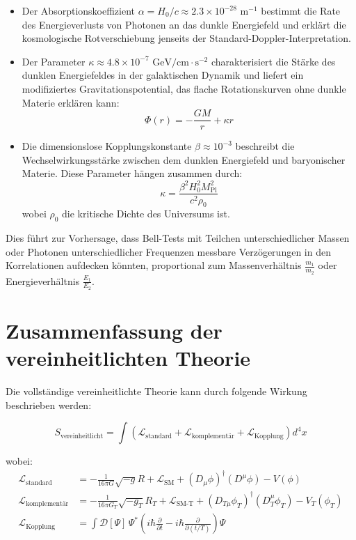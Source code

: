 \documentclass{article}
\begin{document}
	\begin{itemize}
		\item Der Absorptionskoeffizient $\alpha = H_0/c \approx 2.3 \times 10^{-28} \text{ m}^{-1}$ bestimmt die Rate des Energieverlusts von Photonen an das dunkle Energiefeld und erklärt die kosmologische Rotverschiebung jenseits der Standard-Doppler-Interpretation.
		
		\item Der Parameter $\kappa \approx 4.8 \times 10^{-7} \text{ GeV/cm}\cdot\text{s}^{-2}$ charakterisiert die Stärke des dunklen Energiefeldes in der galaktischen Dynamik und liefert ein modifiziertes Gravitationspotential, das flache Rotationskurven ohne dunkle Materie erklären kann:
		\[
		\Phi(r) = -\frac{GM}{r} + \kappa r
		\]
		
		\item Die dimensionslose Kopplungskonstante $\beta \approx 10^{-3}$ beschreibt die Wechselwirkungsstärke zwischen dem dunklen Energiefeld und baryonischer Materie. Diese Parameter hängen zusammen durch:
		\[
		\kappa = \frac{\beta^2 H_0^2 M_{\text{Pl}}^2}{c^2 \rho_0}
		\]
		wobei $\rho_0$ die kritische Dichte des Universums ist.
	\end{itemize}
	
	Dies führt zur Vorhersage, dass Bell-Tests mit Teilchen unterschiedlicher Massen oder Photonen unterschiedlicher Frequenzen messbare Verzögerungen in den Korrelationen aufdecken könnten, proportional zum Massenverhältnis $\frac{m_1}{m_2}$ oder Energieverhältnis $\frac{E_1}{E_2}$.
	
	\section{Zusammenfassung der vereinheitlichten Theorie}
	
	Die vollständige vereinheitlichte Theorie kann durch folgende Wirkung beschrieben werden:
	
	\begin{equation}
		S_\text{vereinheitlicht} = \int \left( \mathcal{L}_\text{standard} + \mathcal{L}_\text{komplementär} + \mathcal{L}_\text{Kopplung} \right) d^4x
	\end{equation}
	
	wobei:
	\begin{align}
		\mathcal{L}_\text{standard} &= -\frac{1}{16\pi G} \sqrt{-g} R + \mathcal{L}_\text{SM} + (D_\mu \phi)^\dagger (D^\mu \phi) - V(\phi) \\
		\mathcal{L}_\text{komplementär} &= -\frac{1}{16\pi G_T} \sqrt{-g_T} R_T + \mathcal{L}_\text{SM-T} + (D_{T\mu} \phi_T)^\dagger (D_T^\mu \phi_T) - V_T(\phi_T) \\
		\mathcal{L}_\text{Kopplung} &= \int \mathcal{D}[\Psi] \, \Psi^* \left( i\hbar \frac{\partial}{\partial t} - i\hbar \frac{\partial}{\partial (t/T)} \right) \Psi
	\end{align}
	
\end{document}

